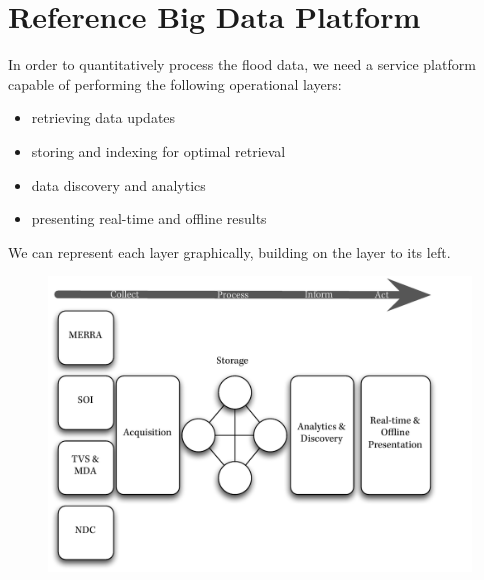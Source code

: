 \section{Reference Big Data Platform}
In order to quantitatively process the flood data, we need a service platform capable of performing the following operational layers:
\begin{itemize}
	\item retrieving data updates
	\item storing and indexing for optimal retrieval
	\item data discovery and analytics
	\item presenting real-time and offline results
\end{itemize}
We can represent each layer graphically, building on the layer to its left. 
\begin{figure}[htp]
    \centering
    \includegraphics[scale=.75]{dataflow}
\end{figure}

